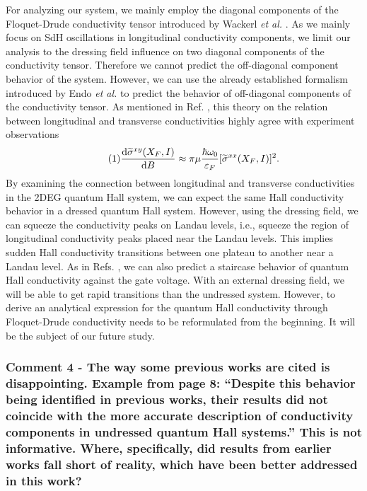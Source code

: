 \documentclass{article}
\begin{document}
For analyzing our system, we mainly employ the diagonal components of the Floquet-Drude conductivity tensor introduced by Wackerl \textit{et al.} \cite{wackerl20}. As we mainly focus on SdH oscillations in longitudinal conductivity components, we limit our analysis to the dressing field influence on two diagonal components of the conductivity tensor.
Therefore we cannot predict the off-diagonal component behavior of the system. However, we can use the already established formalism introduced by Endo \textit{et al.} \cite{endo09} to predict the behavior of off-diagonal components of the conductivity tensor. As mentioned in Ref. \cite{endo09}, this theory on the relation between longitudinal and transverse conductivities highly agree with  experiment observations
\begin{equation} \tag{1}
  \dv{\widetilde{\sigma}^{xy}(X_F,I)}{B} \approx
    \pi\mu \frac{\hbar \omega_0}{\varepsilon_F} [\widetilde{\sigma}^{xx}(X_F,I)]^2.
\end{equation}
By examining the connection between longitudinal and transverse conductivities in the 2DEG quantum Hall system, we can expect the same Hall conductivity behavior in a dressed quantum Hall system. However, using the dressing field, we can squeeze the conductivity peaks on Landau levels, i.e., squeeze the region of longitudinal conductivity peaks placed near the Landau levels. This  implies sudden Hall conductivity transitions between one plateau to another near a Landau level. As in Refs.  \cite{klitzing80,gusynin06}, we can also predict a staircase behavior of quantum Hall conductivity against the gate voltage. With an external dressing field, we will be able to get rapid transitions than the undressed system. However, to derive an analytical expression for the quantum Hall conductivity through Floquet-Drude conductivity needs to be reformulated from the beginning. It will be the subject of our future study.

\subsubsection*{Comment 4 -
\color{RoyalBlue} The way some previous works are cited is disappointing. Example from page 8: “Despite this behavior being identified in previous works, their results did not coincide with the more accurate description of conductivity components in undressed quantum Hall systems.” This is not informative. Where, specifically, did results from earlier works fall short of reality, which have been better addressed in this work?
}
\end{document}
